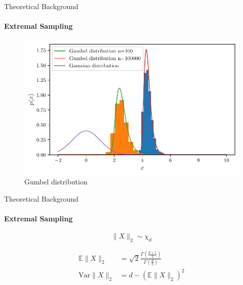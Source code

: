 \documentclass[aspectratio=169]{beamer}
\begin{document}
\begin{frame}{Theoretical Background}
    \framesubtitle{Extremal Sampling}
    
\begin{figure}[htpb]
	\centering
        \includegraphics[height=0.7\textheight]{beamer-figures/samples/gumbel_uni.pdf}
	\caption{Gumbel distribution}%
	\label{fig:gumbel_uni}
\end{figure}
    
\end{frame}
\begin{frame}{Theoretical Background}
    \framesubtitle{Extremal Sampling}
    
\begin{equation}%
	\label{eq:sq_norm_chi}
	\lVert X \rVert_2 \sim \chi_d
\end{equation}

\begin{equation}
	\begin{aligned}%
		\label{eq:mean_var_sq_dist}
		\mathbb{E} \lVert X \rVert_2   & = \sqrt{2} \frac{\Gamma(\frac{d +
		1}{2})}{\Gamma(\frac{d}{2})}                                            \\
		\mathrm{Var} \lVert X \rVert_2 & = d - (\mathbb{E} \lVert X \rVert_2)^2
	\end{aligned}
\end{equation}
\end{frame}
\end{document}
